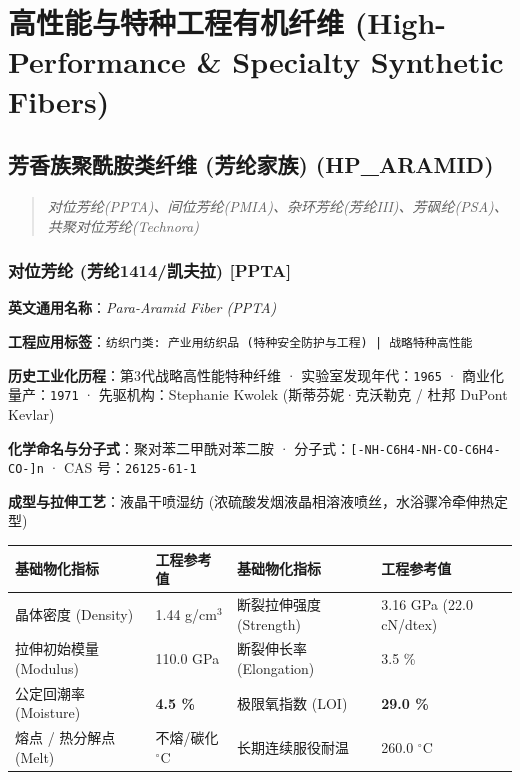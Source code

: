 \documentclass[11pt,openright,twoside,UTF8]{ctexbook}
\begin{document}
\part{高性能与特种工程有机纤维 (High-Performance \& Specialty Synthetic Fibers)}

\chapter{芳香族聚酰胺类纤维 (芳纶家族) (HP\_ARAMID)}
\begin{quote}
\small\itshape
对位芳纶(PPTA)、间位芳纶(PMIA)、杂环芳纶(芳纶III)、芳砜纶(PSA)、共聚对位芳纶(Technora)
\end{quote}

\section{对位芳纶 (芳纶1414/凯夫拉) [PPTA]}
\label{sec:ppta}

\noindent\textbf{英文通用名称}：\textit{Para-Aramid Fiber (PPTA)}\par
\noindent\textbf{工程应用标签}：\texttt{纺织门类: 产业用纺织品 (特种安全防护与工程) | 战略特种高性能}\par
\noindent\textbf{历史工业化历程}：第3代战略高性能特种纤维 · 实验室发现年代：\texttt{1965} · 商业化量产：\texttt{1971} · 先驱机构：Stephanie Kwolek (斯蒂芬妮·克沃勒克 / 杜邦 DuPont Kevlar)\par
\noindent\textbf{化学命名与分子式}：聚对苯二甲酰对苯二胺 · 分子式：\texttt{[-NH-C6H4-NH-CO-C6H4-CO-]n} · CAS 号：\texttt{26125-61-1}\par
\noindent\textbf{成型与拉伸工艺}：液晶干喷湿纺 (浓硫酸发烟液晶相溶液喷丝，水浴骤冷牵伸热定型)\par

\vspace{0.15cm}
\begin{center}
\small
\begin{tabularx}{\textwidth}{p{3.8cm}Xp{3.8cm}X}
\toprule
\textbf{基础物化指标} & \textbf{工程参考值} & \textbf{基础物化指标} & \textbf{工程参考值} \\
\midrule
晶体密度 (Density) & 1.44 g/cm$^3$ & 断裂拉伸强度 (Strength) & 3.16 GPa (22.0 cN/dtex) \\
拉伸初始模量 (Modulus) & 110.0 GPa & 断裂伸长率 (Elongation) & 3.5 \% \\
公定回潮率 (Moisture) & \textbf{4.5 \%} & 极限氧指数 (LOI) & \textbf{29.0 \%} \\
熔点 / 热分解点 (Melt) & 不熔/碳化 $^\circ\mathrm{C}$ & 长期连续服役耐温 & 260.0 $^\circ\mathrm{C}$ \\
\bottomrule
\end{tabularx}
\end{center}
\vspace{0.15cm}
\end{document}
